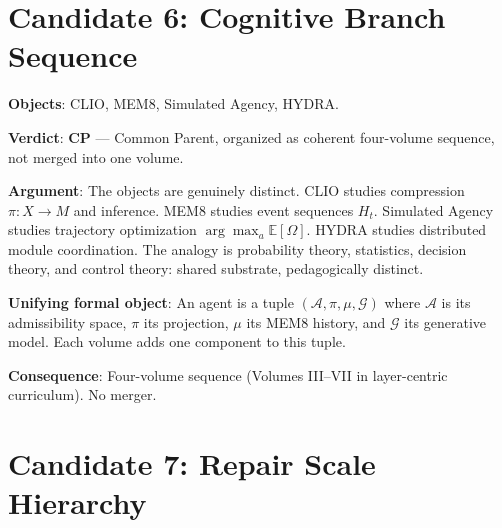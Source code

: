 \documentclass[11pt, a4paper]{book}
\theoremstyle{flyxion}
\theoremstyle{remark}
\begin{document}
\section{Candidate 6: Cognitive Branch Sequence}

\begin{flybox}
\textbf{Objects}: CLIO, MEM\textbar{}8, Simulated Agency, HYDRA.

\textbf{Verdict}: \textbf{CP} --- Common Parent, organized as
coherent four-volume sequence, not merged into one volume.

\textbf{Argument}: The objects are genuinely distinct. CLIO studies
compression $\pi: X \to M$ and inference. MEM\textbar{}8 studies
event sequences $H_t$. Simulated Agency studies trajectory
optimization $\arg\max_a \mathbb{E}[\Omega]$. HYDRA studies
distributed module coordination. The analogy is probability theory,
statistics, decision theory, and control theory: shared substrate,
pedagogically distinct.

\textbf{Unifying formal object}: An agent is a tuple
$(\mathcal{A}, \pi, \mu, \mathcal{G})$ where $\mathcal{A}$ is its
admissibility space, $\pi$ its projection, $\mu$ its MEM\textbar{}8
history, and $\mathcal{G}$ its generative model. Each volume adds
one component to this tuple.

\textbf{Consequence}: Four-volume sequence (Volumes III--VII in
layer-centric curriculum). No merger.
\end{flybox}

\section{Candidate 7: Repair Scale Hierarchy}
\end{document}
